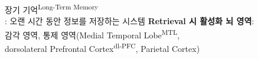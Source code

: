 \documentclass{beamer}
\begin{document}
\begin{frame}{장기 기억\textsuperscript{Long-Term Memory}\\\normalsize{: 오랜 시간 동안 정보를 저장하는 시스템}}
  \vspace{-2em}
  \textbf{Retrieval 시 활성화 뇌 영역}:\\
  감각 영역, 통제 영역(Medial Temporal Lobe\textsuperscript{MTL}, \\\qquad dorsolateral Prefrontal Cortex\textsuperscript{dl-PFC}, Parietal Cortex)
  \vspace{-3.5em}


\end{frame}
\end{document}
